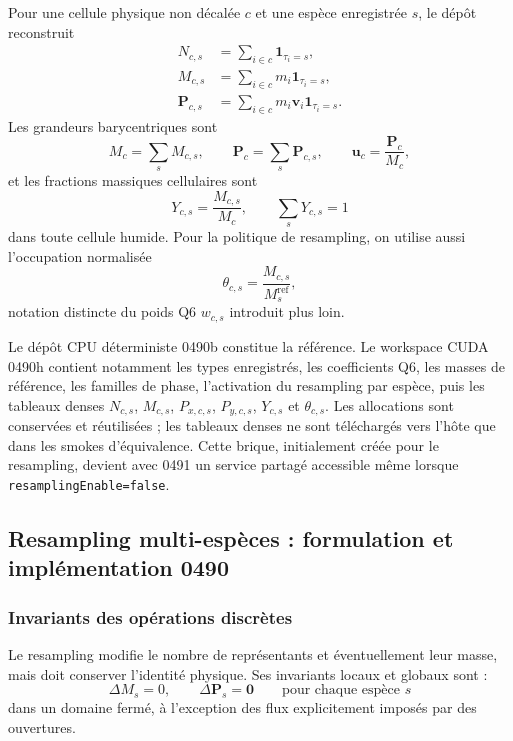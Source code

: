 \documentclass[11pt,a4paper]{article}
\begin{document}
Pour une cellule physique non décalée $c$ et une espèce enregistrée $s$, le dépôt reconstruit
\begin{align}
  N_{c,s} &= \sum_{i\in c}\mathbf{1}_{\tau_i=s},\\
  M_{c,s} &= \sum_{i\in c}m_i\mathbf{1}_{\tau_i=s},\\
  \bm{P}_{c,s} &= \sum_{i\in c}m_i\bm{v}_i\mathbf{1}_{\tau_i=s}.
\end{align}
Les grandeurs barycentriques sont
\begin{equation}
  M_c=\sum_sM_{c,s},\qquad
  \bm{P}_c=\sum_s\bm{P}_{c,s},\qquad
  \bm{u}_c=\frac{\bm{P}_c}{M_c},
\end{equation}
et les fractions massiques cellulaires sont
\begin{equation}
  Y_{c,s}=\frac{M_{c,s}}{M_c},
  \qquad \sum_sY_{c,s}=1
\end{equation}
dans toute cellule humide. Pour la politique de resampling, on utilise aussi l'occupation normalisée
\begin{equation}
  \theta_{c,s}=\frac{M_{c,s}}{M_s^{\mathrm{ref}}},
\end{equation}
notation distincte du poids Q6 $w_{c,s}$ introduit plus loin.

Le dépôt CPU déterministe 0490b constitue la référence. Le workspace CUDA 0490h contient notamment les types enregistrés, les coefficients Q6, les masses de référence, les familles de phase, l'activation du resampling par espèce, puis les tableaux denses $N_{c,s}$, $M_{c,s}$, $P_{x,c,s}$, $P_{y,c,s}$, $Y_{c,s}$ et $\theta_{c,s}$. Les allocations sont conservées et réutilisées ; les tableaux denses ne sont téléchargés vers l'hôte que dans les smokes d'équivalence. Cette brique, initialement créée pour le resampling, devient avec 0491 un service partagé accessible même lorsque \texttt{resamplingEnable=false}.

\subsection{Resampling multi-espèces : formulation et implémentation 0490}

\subsubsection{Invariants des opérations discrètes}

Le resampling modifie le nombre de représentants et éventuellement leur masse, mais doit conserver l'identité physique. Ses invariants locaux et globaux sont :
\begin{equation}
  \Delta M_s=0,
  \qquad \Delta\bm{P}_s=\bm{0}
  \qquad \text{pour chaque espèce }s
\end{equation}
dans un domaine fermé, à l'exception des flux explicitement imposés par des ouvertures.
\end{document}
